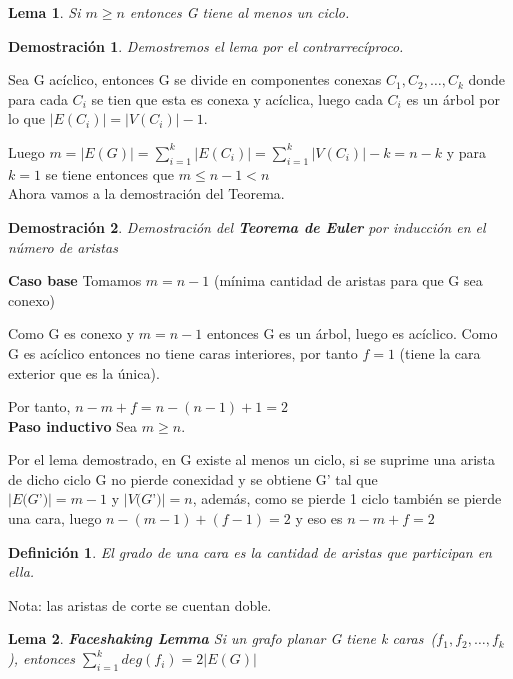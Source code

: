 \documentclass[a4paper,1pt]{report}
\newtheorem*{dem}{Demostración}
\newtheorem*{dfn}{Definición}
\newtheorem*{lem}{Lema}
\begin{document}
\begin{lem}
 Si $m\geq n$ entonces G tiene al menos un ciclo.
\end{lem}

\begin{dem}
Demostremos el lema por el contrarrecíproco. 
\end{dem}

Sea G acíclico, entonces G se divide en componentes conexas $C_1,C_2,\dots,C_k$ donde para cada $C_i$ se tien que esta es conexa y acíclica, luego cada $C_i$ es un árbol por lo que $|E(C_i)|=|V(C_i)|-1$. 

Luego $m=|E(G)|=\sum^k_{i=1}|E(C_i)|=\sum^k_{i=1}|V(C_i)|-k=n-k$ y para $k=1$ se tiene entonces que $m\leq n-1 < n$\\

Ahora vamos a la demostración del Teorema.

\begin{dem}
Demostración del \textbf{Teorema de Euler} por inducción en el número de aristas
\end{dem}


\textbf{Caso base} Tomamos $m=n-1$ (mínima cantidad de aristas para que G sea conexo)

Como G es conexo y  $m=n-1$  entonces G es un \'arbol, luego es acíclico. Como G es acíclico entonces no tiene caras interiores, por tanto $f=1$ (tiene la cara exterior que es la única).

Por tanto, $n-m+f=n - (n-1)+1=2$\\



\textbf{Paso inductivo} Sea $m\geq n$.

Por el lema demostrado, en G existe al menos un ciclo, si se suprime una arista de dicho ciclo G no pierde conexidad y se obtiene G'  tal que \\
$|E(G$'$)| = m-1$ y $|V(G$'$)|=n$, además, como se pierde 1 ciclo también se pierde una cara, luego $n-(m-1)+ (f-1)=2$ y eso es $n-m+f=2$

\begin{dfn}
 El grado de una cara es la cantidad de aristas que participan en ella.
\end{dfn}


Nota: las aristas de corte se cuentan doble.

\begin{lem} \textbf{Faceshaking Lemma}
 Si un grafo planar G tiene k caras~($f_1,f_2,\dots,f_k$), entonces $\sum^k_{i=1}deg(f_i)=2|E(G)|$
\end{lem}
\end{document}
